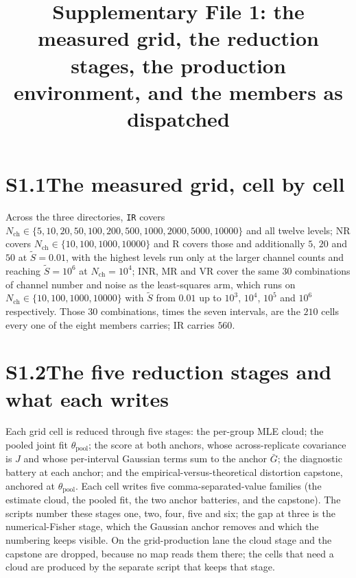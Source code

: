 \documentclass[11pt]{article}
\title{Supplementary File 1: the measured grid, the reduction stages, the production environment,
and the members as dispatched}
\author{}
\date{}
\begin{document}
\maketitle

\section*{S1.1\quad The measured grid, cell by cell}

Across the three directories, \texttt{IR} covers
$N_{\mathrm{ch}} \in \{5, 10, 20, 50, 100, 200, 500, 1000, 2000, 5000, 10000\}$ and
all twelve levels; NR covers
$N_{\mathrm{ch}} \in \{10, 100, 1000, 10000\}$ and R covers those and additionally
$5$, $20$ and $50$ at $\widetilde{S} = 0.01$, with the highest levels run only at the larger
channel counts and reaching $\widetilde{S} = 10^6$ at $N_{\mathrm{ch}} = 10^4$; INR, MR and
VR cover the same $30$ combinations of channel number and noise as the least-squares arm, which
runs on $N_{\mathrm{ch}} \in \{10, 100, 1000, 10000\}$ with $\widetilde{S}$ from
$0.01$ up to $10^3$, $10^4$, $10^5$ and $10^6$ respectively. Those $30$ combinations, times the
seven intervals, are the $210$ cells every one of the eight members carries; IR carries $560$.

\section*{S1.2\quad The five reduction stages and what each writes}

Each grid cell is reduced through five stages: the per-group MLE cloud; the pooled
joint fit $\theta_{\mathrm{pool}}$; the score at both anchors, whose
across-replicate covariance is $J$ and whose per-interval Gaussian terms sum to the
anchor $\bar G$; the diagnostic battery at each anchor; and the
empirical-versus-theoretical distortion capstone, anchored at
$\theta_{\mathrm{pool}}$. Each cell writes five comma-separated-value families (the
estimate cloud, the pooled fit, the two anchor batteries, and the capstone). The
scripts number these stages one, two, four, five and six; the gap at three is the
numerical-Fisher stage, which the Gaussian anchor removes and which the numbering
keeps visible. On the grid-production lane the cloud stage and the capstone are
dropped, because no map reads them there; the cells that need a cloud are produced
by the separate script that keeps that stage.
\end{document}
